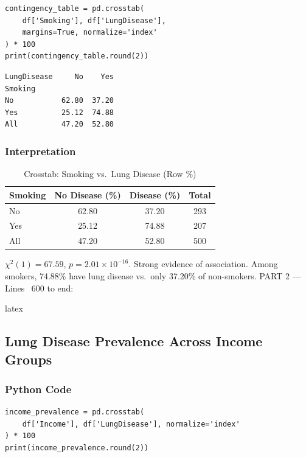 \documentclass[12pt,a4paper]{article}
\begin{document}
\begin{lstlisting}[style=pythonstyle]
contingency_table = pd.crosstab(
    df['Smoking'], df['LungDisease'],
    margins=True, normalize='index'
) * 100
print(contingency_table.round(2))
\end{lstlisting}

\begin{lstlisting}[style=outputstyle]
LungDisease     No    Yes
Smoking
No           62.80  37.20
Yes          25.12  74.88
All          47.20  52.80
\end{lstlisting}

\subsubsection{Interpretation}

\begin{table}[H]
  \centering
  \caption{Crosstab: Smoking vs.\ Lung Disease (Row \%)}
  \begin{tabular}{lccc}
    \toprule
    \textbf{Smoking} & \textbf{No Disease (\%)} & \textbf{Disease (\%)} & \textbf{Total} \\
    \midrule
    No  & 62.80 & 37.20 & 293 \\
    Yes & 25.12 & 74.88 & 207 \\
    \midrule
    All & 47.20 & 52.80 & 500 \\
    \bottomrule
  \end{tabular}
\end{table}

$\chi^2(1) = 67.59$, $p = 2.01 \times 10^{-16}$. Strong evidence of association. Among smokers, 74.88\% have lung disease vs.\ only 37.20\% of non-smokers.
PART 2 — Lines ~600 to end:

latex
\subsection{Lung Disease Prevalence Across Income Groups}

\subsubsection{Python Code}

\begin{lstlisting}[style=pythonstyle]
income_prevalence = pd.crosstab(
    df['Income'], df['LungDisease'], normalize='index'
) * 100
print(income_prevalence.round(2))
\end{lstlisting}
\end{document}
